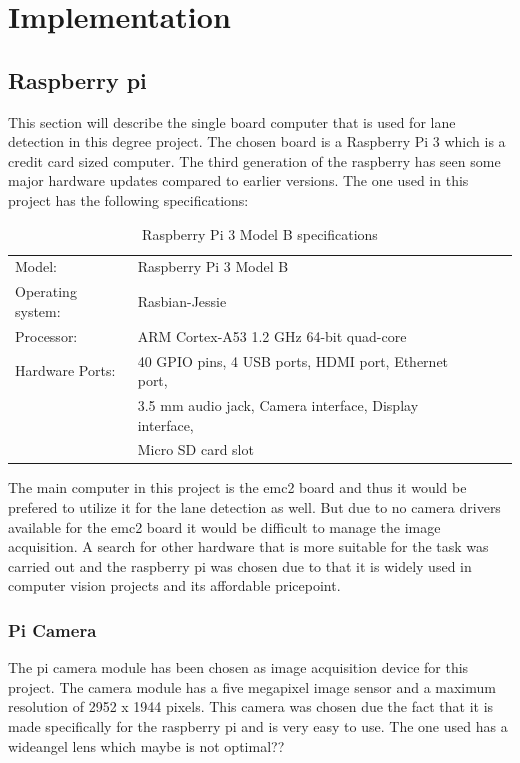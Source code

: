 \chapter{Implementation}


\section{Raspberry pi}
This section will describe the single board computer that is used for lane detection in this degree project. The chosen board is a Raspberry Pi 3 which is a credit card sized computer. The third generation of the raspberry has seen some major hardware updates compared to earlier versions. The one used in this project has the following specifications:



\begin{table}[H]
\centering
\caption{Raspberry Pi 3 Model B specifications}
\label{my-label}
\begin{tabular}{lllll}
 Model:	&Raspberry Pi 3 Model B  \\
 Operating system:	&Rasbian-Jessie  \\
 Processor:	&ARM Cortex-A53 1.2 GHz 64-bit quad-core  \\
 Hardware Ports:	&40 GPIO pins, 4 USB ports, HDMI port, Ethernet port,\\  &3.5 mm audio jack, Camera interface, Display interface,\\  &Micro SD card slot
\end{tabular}
\end{table}



The main computer in this project is the emc2 board and thus it would be prefered to utilize it for the lane detection as well. But due to no camera drivers available for the emc2 board it would be difficult to manage the image acquisition. A search for other hardware that is more suitable for the task was carried out and the raspberry pi was chosen due to that it is widely used in computer vision projects and its affordable pricepoint.

\subsection{Pi Camera}
The pi camera module has been chosen as image acquisition device for this project. The camera module has a five megapixel image sensor and a maximum resolution of 2952 x 1944 pixels. This camera was chosen due the fact that it is made specifically for the raspberry pi and is very easy to use. The one used has a wideangel lens which maybe is not optimal??






